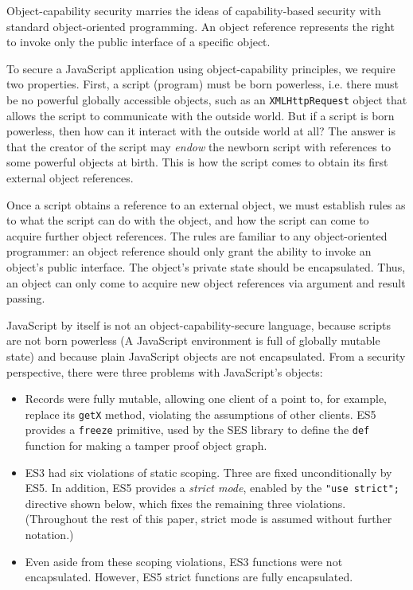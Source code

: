 \documentclass{llncs}
\begin{document}
Object-capability security marries the ideas of capability-based security with standard object-oriented programming. An object reference represents the right to invoke only the public interface of a specific object.

To secure a JavaScript application using object-capability principles, we require two properties. First, a script (program) must be born powerless, i.e. there must be no powerful globally accessible objects, such as an {\tt XMLHttpRequest} object that allows the script to communicate with the outside world. But if a script is born powerless, then how can it interact with the outside world at all? The answer is that the creator of the script may \emph{endow} the newborn script with references to some powerful objects at birth. This is how the script comes to obtain its first external object references.

Once a script obtains a reference to an external object, we must establish rules as to what the script can do with the object, and how the script can come to acquire further object references. The rules are familiar to any object-oriented programmer: an object reference should only grant the ability to invoke an object's public interface. The object's private state should be encapsulated. Thus, an object can only come to acquire new object references via argument and result passing.

JavaScript by itself is not an object-capability-secure language, because scripts are not born powerless (A JavaScript environment is full of globally mutable state) and because plain JavaScript objects are not encapsulated. From a security perspective, there were three problems with JavaScript's objects:

\begin{itemize}
\item Records were fully mutable, allowing one client of a point to, for example, replace its {\tt getX} method, violating the assumptions of other clients. ES5 provides a {\tt freeze} primitive, used by the SES library to define the {\tt def} function for making a tamper proof object graph.
\item ES3 had six violations of static scoping. Three are fixed unconditionally by ES5. In addition, ES5 provides a \emph{strict mode}, enabled by the {\tt "use strict";} directive shown below, which fixes the remaining three violations. (Throughout the rest of this paper, strict mode is assumed without further notation.)  
\item Even aside from these scoping violations, ES3 functions were not encapsulated. However, ES5 strict functions are fully encapsulated.
\end{itemize}
\end{document}
